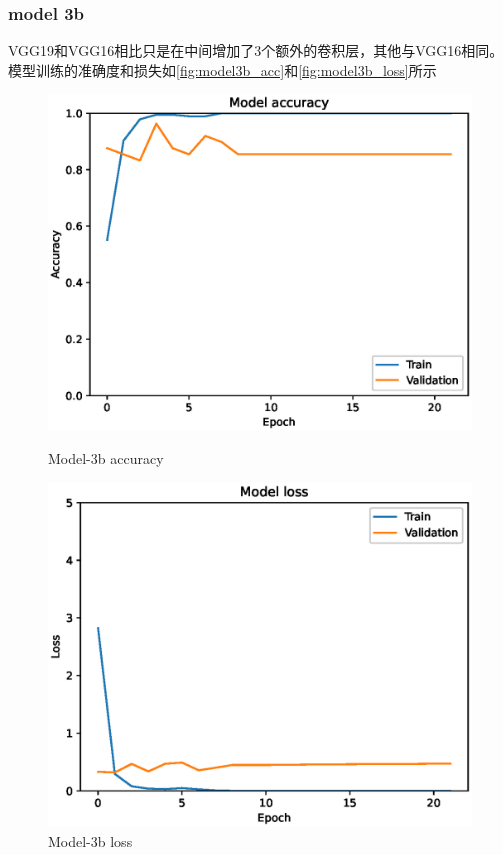 \subsubsection{model 3b}
VGG19和VGG16相比只是在中间增加了3个额外的卷积层，其他与VGG16相同。模型训练的准确度和损失如\autoref{fig:model3b_acc}和\autoref{fig:model3b_loss}所示

\begin{figure}
    \centering
    \begin{minipage}{0.45\textwidth}
        \centering
        \includegraphics[width=\textwidth]{./fig/model3/accuracy3b.eps}
        \caption{Model-3b accuracy}
        \label{fig:model3b_acc}
    \end{minipage}
    \begin{minipage}{0.45\textwidth}
        \centering
        \includegraphics[width=\textwidth]{./fig/model3/loss3b.eps}
        \caption{Model-3b loss}
        \label{fig:model3b_loss}
    \end{minipage}
\end{figure}

